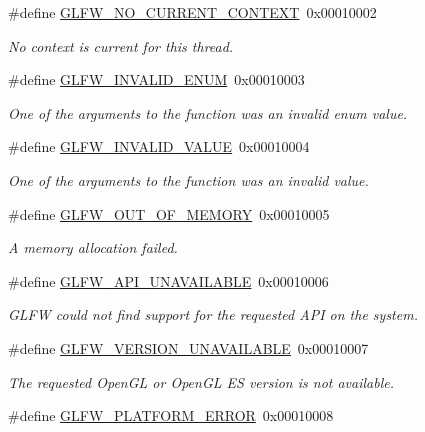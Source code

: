 \begin{DoxyCompactItemize}
\#define \hyperlink{group__errors_gaa8290386e9528ccb9e42a3a4e16fc0d0}{G\+L\+F\+W\+\_\+\+N\+O\+\_\+\+C\+U\+R\+R\+E\+N\+T\+\_\+\+C\+O\+N\+T\+E\+XT}~0x00010002
\begin{DoxyCompactList}\small\item\em No context is current for this thread. \end{DoxyCompactList}\item 
\#define \hyperlink{group__errors_ga76f6bb9c4eea73db675f096b404593ce}{G\+L\+F\+W\+\_\+\+I\+N\+V\+A\+L\+I\+D\+\_\+\+E\+N\+UM}~0x00010003
\begin{DoxyCompactList}\small\item\em One of the arguments to the function was an invalid enum value. \end{DoxyCompactList}\item 
\#define \hyperlink{group__errors_gaaf2ef9aa8202c2b82ac2d921e554c687}{G\+L\+F\+W\+\_\+\+I\+N\+V\+A\+L\+I\+D\+\_\+\+V\+A\+L\+UE}~0x00010004
\begin{DoxyCompactList}\small\item\em One of the arguments to the function was an invalid value. \end{DoxyCompactList}\item 
\#define \hyperlink{group__errors_ga9023953a2bcb98c2906afd071d21ee7f}{G\+L\+F\+W\+\_\+\+O\+U\+T\+\_\+\+O\+F\+\_\+\+M\+E\+M\+O\+RY}~0x00010005
\begin{DoxyCompactList}\small\item\em A memory allocation failed. \end{DoxyCompactList}\item 
\#define \hyperlink{group__errors_ga56882b290db23261cc6c053c40c2d08e}{G\+L\+F\+W\+\_\+\+A\+P\+I\+\_\+\+U\+N\+A\+V\+A\+I\+L\+A\+B\+LE}~0x00010006
\begin{DoxyCompactList}\small\item\em G\+L\+FW could not find support for the requested A\+PI on the system. \end{DoxyCompactList}\item 
\#define \hyperlink{group__errors_gad16c5565b4a69f9c2a9ac2c0dbc89462}{G\+L\+F\+W\+\_\+\+V\+E\+R\+S\+I\+O\+N\+\_\+\+U\+N\+A\+V\+A\+I\+L\+A\+B\+LE}~0x00010007
\begin{DoxyCompactList}\small\item\em The requested Open\+GL or Open\+GL ES version is not available. \end{DoxyCompactList}\item 
\#define \hyperlink{group__errors_gad44162d78100ea5e87cdd38426b8c7a1}{G\+L\+F\+W\+\_\+\+P\+L\+A\+T\+F\+O\+R\+M\+\_\+\+E\+R\+R\+OR}~0x00010008

\end{DoxyCompactItemize}

